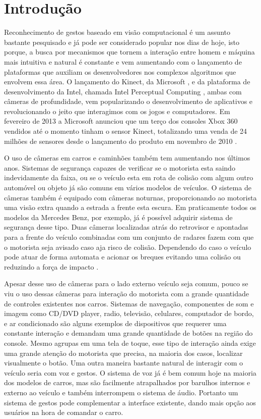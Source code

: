 \chapter{Introdução}

Reconhecimento de gestos baseado em visão computacional é um assunto bastante pesquisado e já pode ser considerado popular nos dias de hoje, isto porque, a busca por mecanismos que tornem a interação entre homem e máquina mais intuitiva e natural é constante e vem aumentando com o lançamento de plataformas que auxiliam os desenvolvedores nos complexos algoritmos que envolvem essa área.
O lançamento do Kinect, da Microsoft \cite{kinect}, e da plataforma de desenvolvimento da Intel, chamada Intel Perceptual Computing \cite{intel},  ambas com câmeras de profundidade, vem popularizando o desenvolvimento de aplicativos e revolucionando o jeito que interagimos com os jogos e computadores. Em fevereiro de 2013 a Microsoft anunciou que um terço dos consoles Xbox 360 vendidos até o momento tinham o sensor Kinect, totalizando  uma venda de 24 milhões de sensores desde o lançamento do produto em novembro de 2010 \cite{news:kinect_sales}.

O uso de câmeras em carros e caminhões também tem aumentando nos últimos anos. Sistemas de segurança capazes de verificar se o motorista esta saindo indevidamente da faixa, ou se o veículo esta em rota de colisão com algum outro automóvel ou objeto já são comuns em vários modelos de veículos. O sistema de câmeras também é equipado com câmeras noturnas, proporcionando ao motorista uma visão extra quando a estrada a frente esta escura. Em praticamente todos os modelos da Mercedes Benz, por exemplo, já é possível adquirir sistema de segurança desse tipo. Duas câmeras localizadas atrás do retrovisor e apontadas para a frente do veículo combinadas com um conjunto de radares fazem com que o motorista seja avisado caso aja risco de colisão. Dependendo do caso o veículo pode atuar de forma automata e acionar os breques evitando uma colisão ou reduzindo a força de impacto \cite{mercedes_youtube} \cite{mercedes_safety}. 

Apesar desse uso de câmeras para o lado externo veículo seja comum, pouco se viu o uso dessas câmeras para interação do motorista com a grande quantidade de controles existentes nos carros. Sistemas de navegação, componentes de som e imagem como CD/DVD player, radio, televisão, celulares, computador de bordo, e ar condicionado são alguns exemplos de dispositivos que requerer uma constante interação e demandam uma grande quantidade de botões na região do console. Mesmo agrupas em uma tela de toque, esse tipo de interação ainda exige uma grande atenção do motorista que precisa, na maioria dos casos, localizar visualmente o botão. Uma outra maneira bastante natural de interagir com o veículo seria com voz e gestos. O sistema de voz já é bem comum hoje na maioria dos modelos de carros, mas são facilmente atrapalhados por barulhos internos e externo ao veículo e também interrompem o sistema de áudio. Portanto um sistema de gestos pode complementar a interface existente, dando mais opção aos usuários na hora de comandar o carro.

